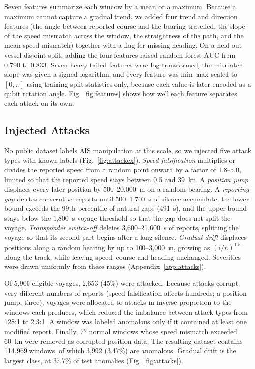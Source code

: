 \documentclass[journal]{IEEEtran}
\begin{document}
Seven features summarize each window by a mean or a maximum. Because a maximum
cannot capture a gradual trend, we added four trend and direction features (the
angle between reported course and the bearing travelled, the slope of the speed
mismatch across the window, the straightness of the path, and the mean speed
mismatch) together with a flag for missing heading. On a held-out
vessel-disjoint split, adding the four features raised random-forest AUC from
0.790 to 0.833. Seven heavy-tailed features were log-transformed, the mismatch
slope was given a signed logarithm, and every feature was min--max scaled to
$[0,\pi]$ using training-split statistics only, because each value is later
encoded as a qubit rotation angle. Fig.~\ref{fig:features} shows how well each
feature separates each attack on its own.

\subsection{Injected Attacks}
No public dataset labels AIS manipulation at this scale, so we injected five
attack types with known labels (Fig.~\ref{fig:attackex}). \emph{Speed
falsification} multiplies or divides the reported speed from a random point
onward by a factor of 1.8--5.0, limited so that the reported speed stays between
0.5 and 39~kn. A \emph{position jump} displaces every later position by
500--20,000~m on a random bearing. A \emph{reporting gap} deletes consecutive
reports until 500--1,700~s of silence accumulate; the lower bound exceeds the
99th percentile of natural gaps (491~s), and the upper bound stays below the
1,800~s voyage threshold so that the gap does not split the voyage.
\emph{Transponder switch-off} deletes 3,600--21,600~s of reports, splitting the
voyage so that its second part begins after a long silence. \emph{Gradual drift}
displaces positions along a random bearing by up to 100--3,000~m, growing as
$(i/n)^{1.5}$ along the track, while leaving speed, course and heading
unchanged. Severities were drawn uniformly from these ranges
(Appendix~\ref{app:attacks}).

Of 5,900 eligible voyages, 2,653 (45\%) were attacked. Because attacks corrupt
very different numbers of reports (speed falsification affects hundreds; a
position jump, three), voyages were allocated to attacks in inverse proportion
to the windows each produces, which reduced the imbalance between attack types
from 128:1 to 2.3:1. A window was labeled anomalous only if it contained at least
one modified report. Finally, 77 normal windows whose speed mismatch exceeded
60~kn were removed as corrupted position data. The resulting dataset contains
114,969 windows, of which 3,992 (3.47\%) are anomalous. Gradual drift is the
largest class, at 37.7\% of test anomalies (Fig.~\ref{fig:attacks}).
\end{document}

